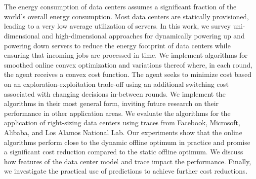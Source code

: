 \chapter{\abstractname}

The energy consumption of data centers assumes a significant fraction of the world's overall energy consumption. Most data centers are statically provisioned, leading to a very low average utilization of servers. In this work, we survey uni-dimensional and high-dimensional approaches for dynamically powering up and powering down servers to reduce the energy footprint of data centers while ensuring that incoming jobs are processed in time. We implement algorithms for smoothed online convex optimization and variations thereof where, in each round, the agent receives a convex cost function. The agent seeks to minimize cost based on an exploration-exploitation trade-off using an additional switching cost associated with changing decisions in-between rounds. We implement the algorithms in their most general form, inviting future research on their performance in other application areas. We evaluate the algorithms for the application of right-sizing data centers using traces from Facebook, Microsoft, Alibaba, and Los Alamos National Lab. Our experiments show that the online algorithms perform close to the dynamic offline optimum in practice and promise a significant cost reduction compared to the static offline optimum. We discuss how features of the data center model and trace impact the performance. Finally, we investigate the practical use of predictions to achieve further cost reductions.
